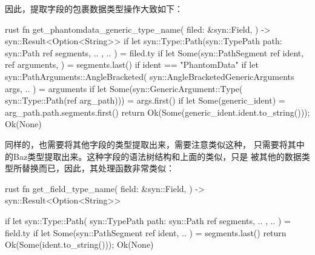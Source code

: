 因此，提取字段的包裹数据类型操作大致如下：
\begin{code-block}{rust}
fn get_phantomdata_generic_type_name(
    filed: &syn::Field,
) -> syn::Result<Option<String>> {
    if let syn::Type::Path(syn::TypePath {
        path: syn::Path { ref segments, .. },
        ..
    }) = filed.ty {
        if let Some(syn::PathSegment {
            ref ident,
            ref arguments,
        }) = segments.last()
        {
            if ident == "PhantomData" {
                if let syn::PathArguments::AngleBracketed(
                    syn::AngleBracketedGenericArguments {
                        args, .. }) = arguments
                {
                    if let Some(syn::GenericArgument::Type(
                        syn::Type::Path(ref arg_path))) = args.first()
                    {
                        if let Some(generic_ident) =
                                arg_path.path.segments.first() {
                            return Ok(Some(generic_ident.ident.to_string()));
                        }
                    }
                }
            }
        }
    }
    Ok(None)
}
\end{code-block}
同样的，也需要将其他字段的类型提取出来，需要注意类似这种，
只需要将其中的Baz类型提取出来。这种字段的语法树结构和上面的类似，只是
被其他的数据类型所替换而已，因此，其处理函数非常类似：
\begin{code-block}{rust}
fn get_field_type_name(
    field: &syn::Field,
) -> syn::Result<Option<String>> {

    if let syn::Type::Path(
        syn::TypePath {
            path: syn::Path { ref segments, .. },
            ..
    }) = field.ty
    {
        if let Some(syn::PathSegment {
            ref ident, .. }) = segments.last() {
            return Ok(Some(ident.to_string()));
        }
    }
    Ok(None)
}
\end{code-block}

